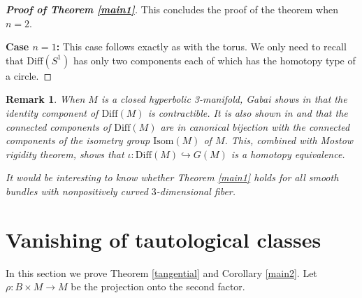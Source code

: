 \documentclass[onecolumn,notitlepage,11pt]{article}
\newcommand{\refer}[1]{\hyperref[#1]{\ref*{#1}}}%
\newtheorem{rmk}{Remark}
\theoremstyle{definition}
\begin{document}
\begin{proof}[\textbf{Proof of Theorem \refer{main1}}]
This concludes the proof of the theorem when $n=2$.

\textbf{Case $n=1$:} This case follows exactly as with the torus. We only
need to recall that $\mbox{Diff}(S^1)$ has only two components each of which has the
homotopy type of a circle.
\end{proof}
\begin{rmk}
When $M$ is a closed hyperbolic 3-manifold,
Gabai shows in \cite{gabai} that the identity component of
$\mbox{Diff}(M)$
is contractible. It is also shown
in \cite{Gab97} and \cite{GMT} that the
connected components of $\mbox{Diff}(M)$ are in canonical 
bijection with the connected components of the isometry group
$\mbox{Isom}(M)$ of $M$.
This, combined with Mostow rigidity theorem, shows that
$\iota: \mbox{Diff}(M)\hookrightarrow G(M)$ is
a homotopy equivalence.

It would be interesting to know whether Theorem \ref{main1} holds 
for all smooth bundles with nonpositively
curved $3$-dimensional fiber.
\end{rmk}
\section{Vanishing of tautological classes}\label{vanishing}
In this section we prove Theorem
\ref{tangential} and Corollary \ref{main2}. 
Let $\rho:B\times M\to M$ be the
projection onto the second factor.
\end{document}
